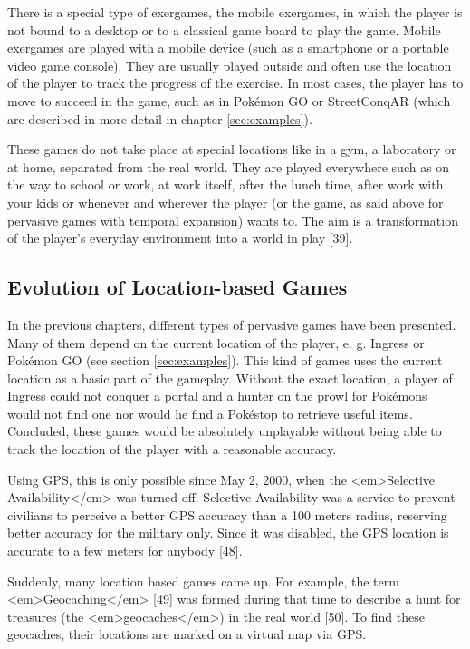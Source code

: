 There is a special type of exergames, the mobile exergames, in which the player is not bound to a desktop or to a classical game board to play the game. Mobile exergames are played with a mobile device (such as a smartphone or a portable video game console). They are usually played outside and often use the location of the player to track the progress of the exercise. In most cases, the player has to move to succeed in the game, such as in Pokémon GO or StreetConqAR (which are described in more detail in chapter \ref{sec:examples}).

These games do not take place at special locations like in a gym, a laboratory or at home, separated from the real world. They are played everywhere such as on the way to school or work, at work itself, after the lunch time, after work with your kids or whenever and wherever the player (or the game, as said above for pervasive games with temporal expansion) wants to. The aim is a transformation of the player’s everyday environment into a world in play [39].


\subsection{Evolution of Location-based Games}
In the previous chapters, different types of pervasive games have been presented. Many of them depend on the current location of the player, e. g. Ingress or Pokémon GO (see section \ref{sec:examples}). This kind of games uses the current location as a basic part of the gameplay. Without the exact location, a player of Ingress could not conquer a portal and a hunter on the prowl for Pokémons would not find one nor would he find a Pokéstop to retrieve useful items. Concluded, these games would be absolutely unplayable without being able to track the location of the player with a reasonable accuracy.

Using GPS, this is only possible since May 2, 2000, when the <em>Selective Availability</em> was turned off. Selective Availability was a service to prevent civilians to perceive a better GPS accuracy than a 100 meters radius, reserving better accuracy for the military only. Since it was disabled, the GPS location is accurate to a few meters for anybody [48].

Suddenly, many location based games came up. For example, the term <em>Geocaching</em> [49] was formed during that time to describe a hunt for treasures (the <em>geocaches</em>) in the real world [50]. To find these geocaches, their locations are marked on a virtual map via GPS.

